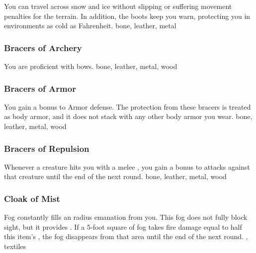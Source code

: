 You can travel across snow and ice without slipping or suffering movement penalties for the terrain.
In addition, the boots keep you warn, protecting you in environments as cold as  Fahrenheit.
 
 bone, leather, metal
\lowercase{\hypertarget{item:Bracers of Archery}{}}\label{item:Bracers of Archery}
\hypertarget{item:Bracers of Archery}{\subsubsection{Bracers of Archery\hfill{}}}
You are proficient with bows.
 
 bone, leather, metal, wood
\lowercase{\hypertarget{item:Bracers of Armor}{}}\label{item:Bracers of Armor}
\hypertarget{item:Bracers of Armor}{\subsubsection{Bracers of Armor\hfill{}}}
You gain a  bonus to Armor defense.
The protection from these bracers is treated as body armor, and it does not stack with any other body armor you wear.
 
 bone, leather, metal, wood
\lowercase{\hypertarget{item:Bracers of Repulsion}{}}\label{item:Bracers of Repulsion}
\hypertarget{item:Bracers of Repulsion}{\subsubsection{Bracers of Repulsion\hfill{}}}
Whenever a creature hits you with a melee , you gain a  bonus to  attacks against that creature until the end of the next round.
 
 bone, leather, metal, wood
\lowercase{\hypertarget{item:Cloak of Mist}{}}\label{item:Cloak of Mist}
\hypertarget{item:Cloak of Mist}{\subsubsection{Cloak of Mist\hfill{}}}
Fog constantly fills an \areamed radius emanation from you.
This fog does not fully block sight, but it provides \concealment.
If a 5-foot square of fog takes fire damage equal to half this item's , the fog disappears from that area until the end of the next round.
 , 
 textiles
